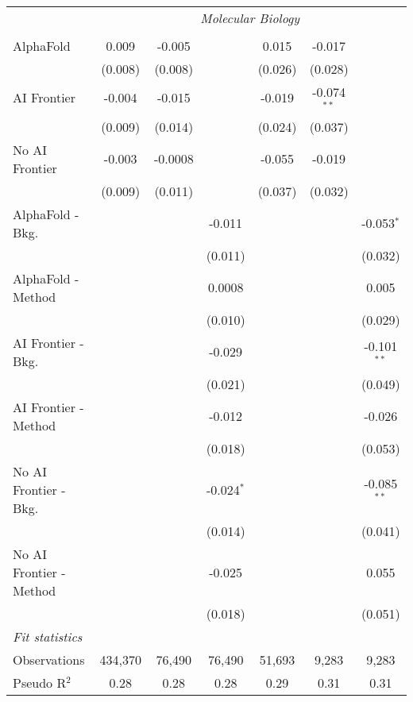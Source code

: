 \begin{tabular}{lcccccc}
 & \multicolumn{6}{c}{\textit{Molecular Biology}} \\ \\
   AlphaFold               & 0.009   & -0.005  &              & 0.015   & -0.017        &   \\   
                           & (0.008) & (0.008) &              & (0.026) & (0.028)       &   \\   
   AI Frontier             & -0.004  & -0.015  &              & -0.019  & -0.074$^{**}$ &   \\   
                           & (0.009) & (0.014) &              & (0.024) & (0.037)       &   \\   
   No AI Frontier          & -0.003  & -0.0008 &              & -0.055  & -0.019        &   \\   
                           & (0.009) & (0.011) &              & (0.037) & (0.032)       &   \\   
   AlphaFold - Bkg.        &         &         & -0.011       &         &               & -0.053$^{*}$\\   
                           &         &         & (0.011)      &         &               & (0.032)\\   
   AlphaFold - Method      &         &         & 0.0008       &         &               & 0.005\\   
                           &         &         & (0.010)      &         &               & (0.029)\\   
   AI Frontier - Bkg.      &         &         & -0.029       &         &               & -0.101$^{**}$\\   
                           &         &         & (0.021)      &         &               & (0.049)\\   
   AI Frontier - Method    &         &         & -0.012       &         &               & -0.026\\   
                           &         &         & (0.018)      &         &               & (0.053)\\   
   No AI Frontier - Bkg.   &         &         & -0.024$^{*}$ &         &               & -0.085$^{**}$\\   
                           &         &         & (0.014)      &         &               & (0.041)\\   
   No AI Frontier - Method &         &         & -0.025       &         &               & 0.055\\   
                           &         &         & (0.018)      &         &               & (0.051)\\   
   \midrule
   \emph{Fit statistics}\\
   Observations            & 434,370 & 76,490  & 76,490       & 51,693  & 9,283         & 9,283\\  
   Pseudo R$^2$            & 0.28    & 0.28    & 0.28         & 0.29    & 0.31          & 0.31\\  
   

\end{tabular}
